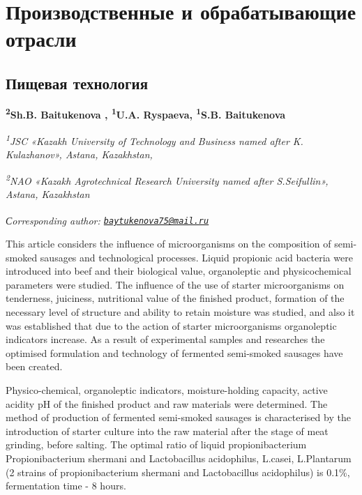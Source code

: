 \newpage
\let\cleardoublepage\clearpage
\part{Производственные и обрабатывающие отрасли}
\chapter{Пищевая технология}

\begin{articleheader}

{\bfseries
\textsuperscript{2}Sh.B. Baitukenova\textsuperscript{\envelope } \authorid,
\textsuperscript{1}U.A. Ryspaeva\authorid,
\textsuperscript{1}S.B. Baitukenova\authorid}
\end{articleheader}

\begin{affiliation}
\emph{\textsuperscript{1}JSC «Kazakh University of Technology and
Business named after K. Kulazhanov», Astana, Kazakhstan,}

\emph{\textsuperscript{2}NAO «Kazakh Agrotechnical Research University
named after S.Seifullin», Astana, Kazakhstan}

\raggedright {\bfseries \textsuperscript{\envelope }}{\em Сorresponding author: \href{mailto:baytukenova75@mail.ru}{\nolinkurl{baytukenova75@mail.ru}}}
\end{affiliation}

This article considers the influence of microorganisms on the
composition of semi-smoked sausages and technological processes. Liquid
propionic acid bacteria were introduced into beef and their biological
value, organoleptic and physicochemical parameters were studied. The
influence of the use of starter microorganisms on tenderness, juiciness,
nutritional value of the finished product, formation of the necessary
level of structure and ability to retain moisture was studied, and also
it was established that due to the action of starter microorganisms
organoleptic indicators increase. As a result of experimental samples
and researches the optimised formulation and technology of fermented
semi-smoked sausages have been created.

Physico-chemical, organoleptic indicators, moisture-holding capacity,
active acidity pH of the finished product and raw materials were
determined. The method of production of fermented semi-smoked sausages
is characterised by the introduction of starter culture into the raw
material after the stage of meat grinding, before salting. The optimal
ratio of liquid propionibacterium Propionibacterium shermani and
Lactobacillus acidophilus, L.casei, L.Plantarum (2 strains of
propionibacterium shermani and Lactobacillus acidophilus) is 0.1\%,
fermentation time - 8 hours.

